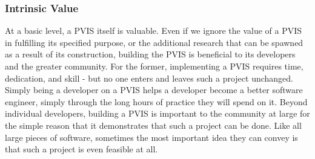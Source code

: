 \documentclass[12pt,oneside,letterpaper]{memoir}
\begin{document}
\subsubsection{Intrinsic Value}

At a basic level, a PVIS itself is valuable. Even if we ignore the
value of a PVIS in fulfilling its specified purpose, or the additional
research that can be spawned as a result of its construction, building
the PVIS is beneficial to its developers and the greater
community. For the former, implementing a PVIS requires time,
dedication, and skill - but no one enters and leaves such a project
unchanged. Simply being a developer on a PVIS helps a developer become
a better software engineer, simply through the long hours of practice
they will spend on it. Beyond individual developers, building a PVIS
is important to the community at large for the simple reason that it
demonstrates that such a project can be done. Like all large pieces of
software, sometimes the most important idea they can convey is that such a project is
even feasible at all.


\end{document}
